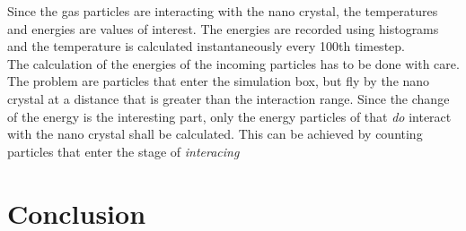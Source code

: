 \documentclass[12pt]{article}
\begin{document}
Since the gas particles are interacting with the nano crystal, the temperatures and energies are values of interest. The energies are recorded using
histograms and the temperature is calculated instantaneously every 100th timestep.\\
The calculation of the energies of the incoming particles has to be done with care. The problem are particles that enter the simulation box, but fly
by the nano crystal at a distance that is greater than the interaction range. Since the change of the energy is the interesting part, only the energy 
particles of that \textit{do} interact with the nano crystal shall be calculated. This can be achieved by counting particles that enter the stage of
\textit{interacing}







\newpage
\section{Conclusion}






\newpage


\end{document}
